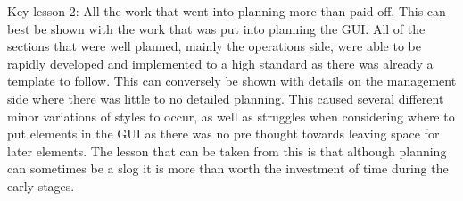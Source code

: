 Key lesson 2:
All the work that went into planning more than paid off. This can best be shown with the work that was put into planning the GUI. All of the sections that were well planned, mainly the operations side, were able to be rapidly developed and implemented to a high standard as there was already a template to follow. This can conversely be shown with details on the management side where there was little to no detailed planning. This caused several different minor variations of styles to occur, as well as struggles when considering where to put elements in the GUI as there was no pre thought towards leaving space for later elements.
The lesson that can be taken from this is that although planning can sometimes be a slog it is  more than worth the investment of time during the early stages.
